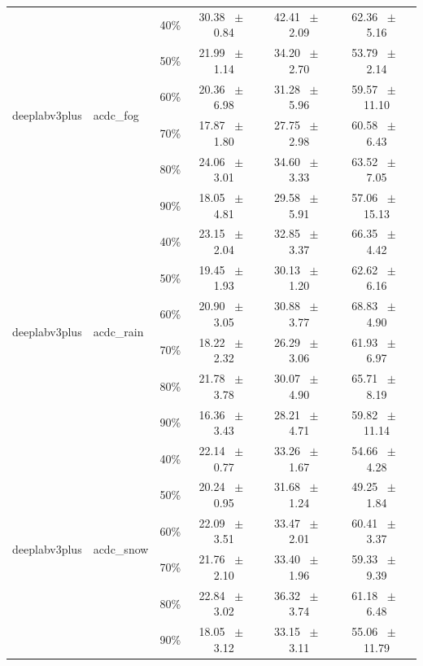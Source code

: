 \begin{table}[h]
\begin{tabular}{@{}l l c c c c@{}}
    \midrule
    \multirow{6}{*}{deeplabv3plus} & \multirow{6}{*}{acdc_fog} & 40\% & 30.38 ~$\pm$~ 0.84 & 42.41 ~$\pm$~ 2.09 & 62.36 ~$\pm$~ 5.16 \\
    & & 50\% & 21.99 ~$\pm$~ 1.14 & 34.20 ~$\pm$~ 2.70 & 53.79 ~$\pm$~ 2.14 \\
    & & 60\% & 20.36 ~$\pm$~ 6.98 & 31.28 ~$\pm$~ 5.96 & 59.57 ~$\pm$~ 11.10 \\
    & & 70\% & 17.87 ~$\pm$~ 1.80 & 27.75 ~$\pm$~ 2.98 & 60.58 ~$\pm$~ 6.43 \\
    & & 80\% & 24.06 ~$\pm$~ 3.01 & 34.60 ~$\pm$~ 3.33 & 63.52 ~$\pm$~ 7.05 \\
    & & 90\% & 18.05 ~$\pm$~ 4.81 & 29.58 ~$\pm$~ 5.91 & 57.06 ~$\pm$~ 15.13 \\
    \midrule
    \multirow{6}{*}{deeplabv3plus} & \multirow{6}{*}{acdc_rain} & 40\% & 23.15 ~$\pm$~ 2.04 & 32.85 ~$\pm$~ 3.37 & 66.35 ~$\pm$~ 4.42 \\
    & & 50\% & 19.45 ~$\pm$~ 1.93 & 30.13 ~$\pm$~ 1.20 & 62.62 ~$\pm$~ 6.16 \\
    & & 60\% & 20.90 ~$\pm$~ 3.05 & 30.88 ~$\pm$~ 3.77 & 68.83 ~$\pm$~ 4.90 \\
    & & 70\% & 18.22 ~$\pm$~ 2.32 & 26.29 ~$\pm$~ 3.06 & 61.93 ~$\pm$~ 6.97 \\
    & & 80\% & 21.78 ~$\pm$~ 3.78 & 30.07 ~$\pm$~ 4.90 & 65.71 ~$\pm$~ 8.19 \\
    & & 90\% & 16.36 ~$\pm$~ 3.43 & 28.21 ~$\pm$~ 4.71 & 59.82 ~$\pm$~ 11.14 \\
    \midrule
    \multirow{6}{*}{deeplabv3plus} & \multirow{6}{*}{acdc_snow} & 40\% & 22.14 ~$\pm$~ 0.77 & 33.26 ~$\pm$~ 1.67 & 54.66 ~$\pm$~ 4.28 \\
    & & 50\% & 20.24 ~$\pm$~ 0.95 & 31.68 ~$\pm$~ 1.24 & 49.25 ~$\pm$~ 1.84 \\
    & & 60\% & 22.09 ~$\pm$~ 3.51 & 33.47 ~$\pm$~ 2.01 & 60.41 ~$\pm$~ 3.37 \\
    & & 70\% & 21.76 ~$\pm$~ 2.10 & 33.40 ~$\pm$~ 1.96 & 59.33 ~$\pm$~ 9.39 \\
    & & 80\% & 22.84 ~$\pm$~ 3.02 & 36.32 ~$\pm$~ 3.74 & 61.18 ~$\pm$~ 6.48 \\
    & & 90\% & 18.05 ~$\pm$~ 3.12 & 33.15 ~$\pm$~ 3.11 & 55.06 ~$\pm$~ 11.79 \\
    \bottomrule
  \end{tabular}
  \label{tab:sparsity_deeplabv3plus}
\end{table}